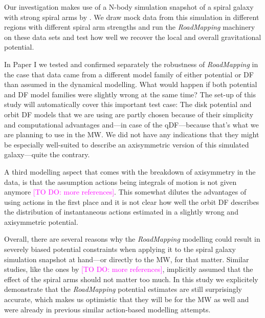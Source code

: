 \documentclass[iop,revtex4,numberedappendix,appendixfloats]{emulateapj}
\newcommand{\RM}{{\sl RoadMapping}}
\newcommand{\Wilma}[1]{\textcolor{Magenta}{#1}}
\begin{document}
Our investigation makes use of a N-body simulation snapshot of a spiral galaxy with strong spiral arms by \citet{2013ApJ...766...34D}. We draw mock data from this simulation in different regions with different spiral arm strengths and run the \RM{} machinery on these data sets and test how well we recover the local and overall gravitational potential.

In Paper I we tested and confirmed separately the robustness of \RM{} in the case that data came from a different model family of either potential or DF than assumed in the dynamical modelling. What would happen if both potential and DF model families were slightly wrong at the same time? The set-up of this study will automatically cover this important test case: The disk potential and orbit DF models that we are using are partly chosen because of their simplicity and computational advantages and---in case of the qDF---because that's what we are planning to use in the MW. We did not have any indications that they might be especially well-suited to describe an axisymmetric version of this simulated galaxy---quite the contrary.

A third modelling aspect that comes with the breakdown of axisymmetry in the data, is that the assumption actions being integrals of motion is not given anymore \citep{2016ApJ...824...39V} \Wilma{[TO DO: more references]}. This somewhat dilutes the advantages of using actions in the first place and it is not clear how well the orbit DF describes the distribution of instantaneous actions estimated in a slightly wrong and axisymmetric potential.

Overall, there are several reasons why the \RM{} modelling could result in severely biased potential constraints when applying it to the spiral galaxy simulation snapshot at hand---or directly to the MW, for that matter. Similar studies, like the ones by \citet{2013ApJ...779..115B,2014MNRAS.445.3133P,2015MNRAS.449.3479S} \Wilma{[TO DO: more references]}, implicitly assumed that the effect of the spiral arms should not matter too much. In this study we explicitely demonstrate that the \RM{} potential estimates are still surprisingly accurate, which makes us optimistic that they will be for the MW as well and were already in previous similar action-based modelling attempts.
\end{document}
